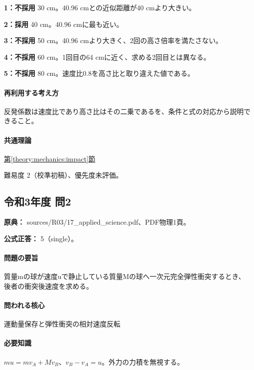\noindent\textbf{1：不採用} 30 cm。40.96 cmとの近似距離が40 cmより大きい。\par

\noindent\textbf{2：採用} 40 cm。40.96 cmに最も近い。\par

\noindent\textbf{3：不採用} 50 cm。40.96 cmより大きく、2回の高さ倍率を満たさない。\par

\noindent\textbf{4：不採用} 60 cm。1回目の64 cmに近く、求める2回目とは異なる。\par

\noindent\textbf{5：不採用} 80 cm。速度比0.8を高さ比と取り違えた値である。\par

\paragraph{再利用する考え方} 反発係数は速度比であり高さ比はその二乗であるを、条件と式の対応から説明できること。

\paragraph{共通理論} \hyperref[theory:mechanics:impact]{第\ref*{theory:mechanics:impact}節}

\par 難易度 2（校準初稿）、優先度未評価。

\subsection{令和3年度 問2}
\label{q:r03-reg-applied-02}

\noindent\textbf{原典：} sources/R03/17\_applied\_science.pdf、PDF物理1頁。

\textbf{公式正答：} 5（single）。

\paragraph{問題の要旨} 質量mの球が速度uで静止している質量Mの球へ一次元完全弾性衝突するとき、後者の衝突後速度を求める。

\paragraph{問われる核心} 運動量保存と弾性衝突の相対速度反転

\paragraph{必要知識} \(mu=mv_A+Mv_B\)、\(v_B-v_A=u\)。外力の力積を無視する。

